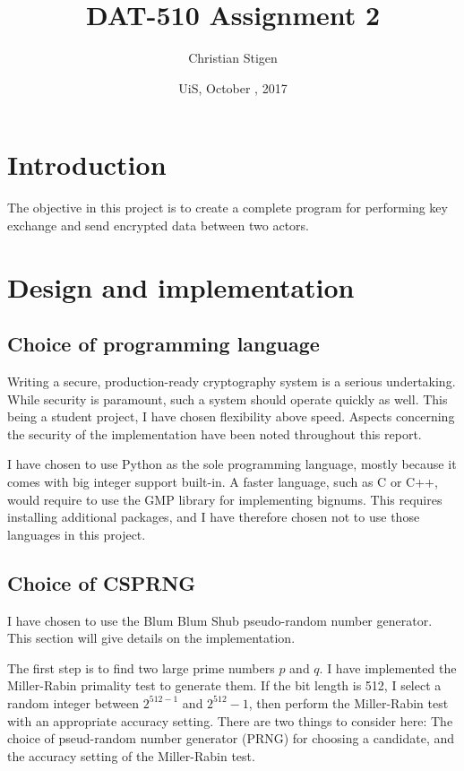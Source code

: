 \documentclass[a4paper,english,12pt]{article}
\title{DAT-510 Assignment 2}
\author{Christian Stigen}
\date{UiS, October \nth{9}, 2017}
\begin{document}
\maketitle

\begin{abstract}
\end{abstract}

\section{Introduction}
The objective in this project is to create a complete program for performing
key exchange and send encrypted data between two actors.

\section{Design and implementation}

\subsection{Choice of programming language}
Writing a secure, production-ready cryptography system is a serious
undertaking. While security is paramount, such a system should operate quickly
as well. This being a student project, I have chosen flexibility above
speed. Aspects concerning the security of the implementation have been noted
throughout this report.

I have chosen to use Python as the sole programming language, mostly because it
comes with big integer support built-in. A faster language, such as C or C++,
would require to use the GMP library \cite{wiki:gmp} for implementing bignums.
This requires installing additional packages, and I have therefore chosen not
to use those languages in this project.

\subsection{Choice of CSPRNG}
I have chosen to use the Blum Blum Shub \cite{bbs} pseudo-random number
generator. This section will give details on the implementation.

The first step is to find two large prime numbers $p$ and $q$. I have
implemented the Miller-Rabin \cite{miller.rabin} primality test to generate
them.
%
If the bit length is 512, I select a random integer between $2^{512-1}$ and
$2^{512}-1$, then perform the Miller-Rabin test with an appropriate accuracy
setting. There are two things to consider here: The choice of pseud-random
number generator (PRNG) for choosing a candidate, and the accuracy setting of
the Miller-Rabin test.
\end{document}
